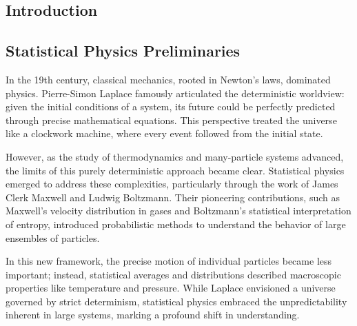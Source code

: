 \documentclass[ansiapaper]{report}
\author{Andrea}
\begin{document}



\fontsize{9}{10}\selectfont%

\renewcommand{\contentsname}{Contents} %


\vskip6pt
\begin{center}
  \noindent {}
\end{center}
\vskip9pt

\begin{multicols}{3}

  \renewcommand{\baselinestretch}{1.1}\normalsize %
  {\footnotesize \sffamily \tableofcontents} %



  \renewcommand{\baselinestretch}{1.0}\normalsize

  \fontsize{9}{10}\selectfont
  \chapter{Introduction}
  \section{Statistical Physics Preliminaries}

  In the 19th century, classical mechanics, rooted in Newton’s laws, dominated physics. Pierre-Simon Laplace famously articulated the deterministic worldview: given the initial conditions of a system, its future could be perfectly predicted through precise mathematical equations. This perspective treated the universe like a clockwork machine, where every event followed from the initial state.

  However, as the study of thermodynamics and many-particle systems advanced, the limits of this purely deterministic approach became clear. Statistical physics emerged to address these complexities, particularly through the work of James Clerk Maxwell and Ludwig Boltzmann. Their pioneering contributions, such as Maxwell's velocity distribution in gases and Boltzmann's statistical interpretation of entropy, introduced probabilistic methods to understand the behavior of large ensembles of particles.

  In this new framework, the precise motion of individual particles became less important; instead, statistical averages and distributions described macroscopic properties like temperature and pressure. While Laplace envisioned a universe governed by strict determinism, statistical physics embraced the unpredictability inherent in large systems, marking a profound shift in understanding.


\end{multicols}
\end{document}
